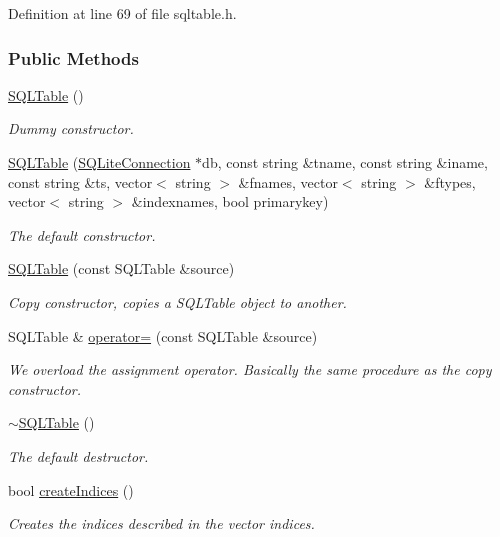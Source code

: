 Definition at line 69 of file sqltable.h.\subsubsection*{Public Methods}
\begin{CompactItemize}
\item 
\hyperlink{classSQLTable_SQLTablea0}{SQLTable} ()
\begin{CompactList}\small\item\em Dummy constructor.\item\end{CompactList}\item 
\hyperlink{classSQLTable_SQLTablea1}{SQLTable} (\hyperlink{classSQLiteConnection}{SQLite\-Connection} $\ast$db, const string \&tname, const string \&iname, const string \&ts, vector$<$ string $>$ \&fnames, vector$<$ string $>$ \&ftypes, vector$<$ string $>$ \&indexnames, bool primarykey)
\begin{CompactList}\small\item\em The default constructor.\item\end{CompactList}\item 
\hyperlink{classSQLTable_SQLTablea2}{SQLTable} (const SQLTable \&source)
\begin{CompactList}\small\item\em Copy constructor, copies a SQLTable object to another.\item\end{CompactList}\item 
SQLTable \& \hyperlink{classSQLTable_SQLTablea3}{operator=} (const SQLTable \&source)
\begin{CompactList}\small\item\em We overload the assignment operator. Basically the same procedure as the copy constructor.\item\end{CompactList}\item 
\hyperlink{classSQLTable_SQLTablea4}{$\sim$SQLTable} ()
\begin{CompactList}\small\item\em The default destructor.\item\end{CompactList}\item 
bool \hyperlink{classSQLTable_SQLTablea5}{create\-Indices} ()
\begin{CompactList}\small\item\em Creates the indices described in the vector indices.\item\end{CompactList}\item 

\end{CompactItemize}

